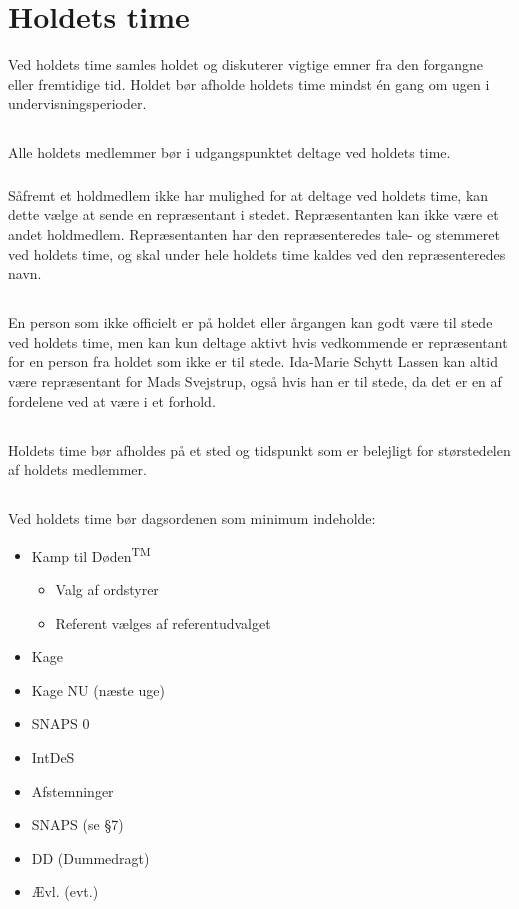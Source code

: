 \documentclass{article}
\newcommand{\KTD}{Kamp til Døden\textsuperscript{TM}}
\let\OldS\S
\renewcommand{\S}{\OldS{}}
\begin{document}
	\section{Holdets time}
	Ved holdets time samles holdet og diskuterer vigtige emner fra den forgangne eller
	fremtidige tid. Holdet bør afholde holdets time mindst én gang om ugen i
	undervisningsperioder.
	\subsection{}
	Alle holdets medlemmer bør i udgangspunktet deltage ved holdets time.
	\subsubsection{}
	Såfremt et holdmedlem ikke har mulighed for at deltage ved holdets time, kan dette vælge at sende en repræsentant i stedet. Repræsentanten kan ikke være et andet holdmedlem. Repræsentanten har den repræsenteredes tale- og stemmeret ved holdets time, og skal under hele holdets time kaldes ved den repræsenteredes navn.
	\subsection{}
	En person som ikke officielt er på holdet eller årgangen kan godt være til stede ved holdets time, men kan kun deltage aktivt hvis vedkommende er repræsentant for en person fra holdet som ikke er til stede. Ida-Marie Schytt Lassen kan altid være repræsentant for Mads Svejstrup, også hvis han er til stede, da det er en af fordelene ved at være i et forhold.
	\subsection{}
	Holdets time bør afholdes på et sted og tidspunkt som er belejligt for størstedelen af holdets medlemmer.
	\subsection{}
	Ved holdets time bør dagsordenen som minimum indeholde:\\
	\begin{itemize}
		\item \KTD
		\begin{itemize}
			\item Valg af ordstyrer
			\item Referent vælges af referentudvalget
		\end{itemize}
		\item Kage
		\item Kage NU (næste uge)
		\item SNAPS 0
		\item IntDeS
		\item Afstemninger
		\item SNAPS (se \S{7})
		\item DD (Dummedragt)
		\item Ævl. (evt.)
	\end{itemize}
\end{document}
